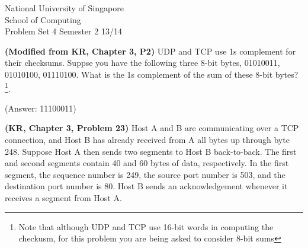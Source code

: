 \documentclass[a4paper,11pt]{exam}
\begin{document}
    \extraheadheight{.5in}
    {\large\sf National University of Singapore\\ School of Computing \\
    \LARGE\sf Problem Set 4}%
    {\large\sf Semester 2 13/14}
    \firstpageheadrule
    \pagestyle{headandfoot}

    \begin{questions}
\question 
\textbf{(Modified from KR, Chapter 3, P2)} 
UDP and TCP use 1s complement for their checksums.  Suppse you have the following three 8-bit bytes, 01010011, 01010100, 01110100.  What is the 1s complement of the sum of these 8-bit bytes?  \footnote{Note that although UDP and TCP use 16-bit words in computing the checkusm, for this problem you are being asked to consider 8-bit sums}.  

(Answer: 11100011)

\question 
\textbf{(KR, Chapter 3, Problem 23)} 
Host A and B are communicating over a TCP connection, and Host B has already received from A all bytes up through byte 248.  Suppose Host A then sends two segments to Host B back-to-back.  The first and second segments contain 40 and 60 bytes of data, respectively.  In the first segment, the sequence number is 249, the source port number is 503, and the destination port number is 80.  Host B sends an acknowledgement whenever it receives a segment from Host A.

\end{questions}
\end{document}
